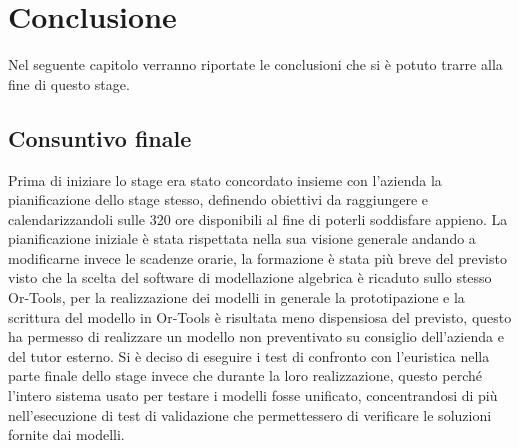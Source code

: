 
\hypertarget{(chap:capitolo8)}{}
\chapter{Conclusione}
Nel seguente capitolo verranno riportate le conclusioni che si è potuto trarre alla fine di questo stage.
\section{Consuntivo finale}
Prima di iniziare lo stage era stato concordato insieme con l'azienda la pianificazione dello stage stesso, definendo obiettivi da raggiungere e calendarizzandoli sulle 320 ore disponibili al fine di poterli soddisfare appieno. La pianificazione iniziale è stata rispettata nella sua visione generale andando a modificarne invece le scadenze orarie, la formazione è stata più breve del previsto visto che la scelta del software di modellazione algebrica è ricaduto sullo stesso Or-Tools, per la realizzazione dei modelli in generale la prototipazione e la scrittura del modello in Or-Tools è risultata meno dispensiosa del previsto, questo ha permesso di realizzare un modello non preventivato su consiglio dell'azienda e del tutor esterno.
Si è deciso di eseguire i test di confronto con l'euristica nella parte finale dello stage invece che durante la loro realizzazione, questo perché l'intero sistema usato per testare i modelli fosse unificato, concentrandosi di più nell'esecuzione di test di validazione che permettessero di verificare le soluzioni fornite dai modelli.

